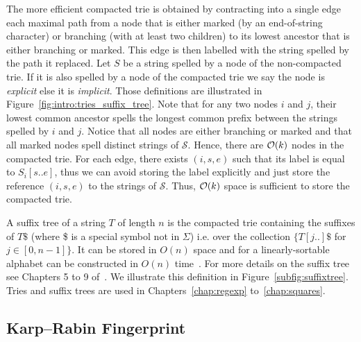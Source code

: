 The more efficient compacted trie is obtained by contracting into a single edge each maximal path from a node that is either marked (by an end-of-string character) or branching (with at least two children) to its lowest ancestor that is either branching or marked.
This edge is then labelled with the string spelled by the path it replaced.
Let $S$ be a string spelled by a node of the non-compacted trie. If it is also spelled by a node of the compacted trie we say the node is \emph{explicit} else it is \emph{implicit}. Those definitions are illustrated in Figure~\ref{fig:intro:tries_suffix_tree}. Note that for any two nodes $i$ and $j$, their lowest common ancestor spells the longest common prefix between the strings spelled by $i$ and $j$.
%
Notice that all nodes are either branching or marked and that all marked nodes spell distinct strings of $\mathcal{S}$. 
Hence, there are $\mathcal{O}(k)$ nodes in the compacted trie.
For each edge, there exists $(i,s,e)$ such that its label is equal to $S_i[s .. e]$, thus we can avoid storing the label explicitly and just store the reference $(i,s,e)$ to the strings of $\mathcal{S}$.
Thus, $\mathcal{O}(k)$ space is sufficient to store the compacted trie.

A suffix tree of a string $T$ of length $n$ is the compacted trie containing the suffixes of $T\$$ (where \$ is a special symbol not in $\Sigma$) i.e. over the collection $\{T[j..]\$$ for $ j \in [0,n-1] \}$. It can be stored in $O(n)$ space and for a linearly-sortable alphabet can be constructed in $O(n)$ time~\cite{Farach1997}. For more details on the suffix tree see Chapters 5 to 9 of~\cite{Gusfield1997}. We illustrate this definition in Figure~\ref{subfig:suffixtree}. Tries and suffix trees are used in Chapters~\ref{chap:regexp} to~\ref{chap:squares}.



\subsection{Karp--Rabin Fingerprint}\label{sec:prelim:KR}

